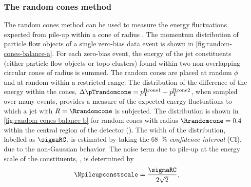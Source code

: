 
\subsubsection{The random cones method}
\label{subsec:random-cones-method}
The random cones method can be used to measure the energy fluctuations expected from pile-up within a cone of radius \Rrandomcone. The momentum distribution of particle flow objects of a single zero-bias data event is shown in \cref{fig:random-cones-balance-a}.
For each zero-bias event, the energy of the jet constituents (either particle flow objects or topo-clusters) found within two non-overlapping circular cones of radius \Rrandomcone is summed.
The random cones are placed at random $\phi$ and at random \abseta within a restricted range.
The distribution of the difference of the energy within the cones, $\Delta \pTrandomcone = p_{\text{T}}^{\text{Rcone1}} - p_{\text{T}}^\text{Rcone2}$, when sampled over many events, provides a measure of the expected energy fluctuations to which a jet with $R = \Rrandomcone$ is subjected.
The distribution is shown in \cref{fig:random-cones-balance-b} for random cones with radius $\Rrandomcone = 0.4$ within the central region of the detector (). The width of the distribution, labelled as $\sigmaRC$, is estimated by taking the \SI{68}{\percent} \emph{confidence interval} (CI), due to the non-Gaussian behavior.
The noise term due to pile-up at the energy scale of the constituents, \Npileupconstscale, is determined by
\begin{equation}
    \Npileupconstscale = \frac{\sigmaRC}{2\sqrt{2}},
\end{equation}
